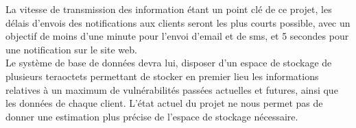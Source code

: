 La vitesse de transmission des information étant un point clé de ce projet, les délais d’envois des notifications aux clients seront les plus courts possible, avec un objectif de moins d’une minute pour l’envoi d’email et de sms, et 5 secondes pour une notification sur le site web.\\
Le système de base de données devra lui, disposer d’un espace de stockage de plusieurs teraoctets permettant de stocker en premier lieu les informations relatives à un maximum de vulnérabilités passées actuelles et futures, ainsi que les données de chaque client. L’état actuel du projet ne nous permet pas de donner une estimation plus précise de l’espace de stockage nécessaire.\\
